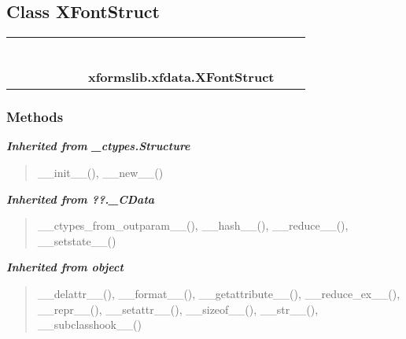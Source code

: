 \subsection{Class XFontStruct}

    \label{xformslib:xfdata:XFontStruct}
\begin{tabular}{cccccccccc}
\multicolumn{2}{r}{\settowidth{\BCL}{object}\multirow{2}{\BCL}{object}}
&&
&&
&&
  \\\cline{3-3}
  &&\multicolumn{1}{c|}{}
&&
&&
&&
  \\
\multicolumn{4}{r}{\settowidth{\BCL}{??.\_CData}\multirow{2}{\BCL}{??.\_CData}}
&&
&&
  \\\cline{5-5}
  &&&&\multicolumn{1}{c|}{}
&&
&&
  \\
\multicolumn{6}{r}{\settowidth{\BCL}{\_ctypes.Structure}\multirow{2}{\BCL}{\_ctypes.Structure}}
&&
  \\\cline{7-7}
  &&&&&&\multicolumn{1}{c|}{}
&&
  \\
&&&&&&\multicolumn{2}{l}{\textbf{xformslib.xfdata.XFontStruct}}
\end{tabular}



  \subsubsection{Methods}


\large{\textbf{\textit{Inherited from \_ctypes.Structure}}}

\begin{quote}
\_\_init\_\_(), \_\_new\_\_()
\end{quote}

\large{\textbf{\textit{Inherited from ??.\_CData}}}

\begin{quote}
\_\_ctypes\_from\_outparam\_\_(), \_\_hash\_\_(), \_\_reduce\_\_(), \_\_setstate\_\_()
\end{quote}

\large{\textbf{\textit{Inherited from object}}}

\begin{quote}
\_\_delattr\_\_(), \_\_format\_\_(), \_\_getattribute\_\_(), \_\_reduce\_ex\_\_(), \_\_repr\_\_(), \_\_setattr\_\_(), \_\_sizeof\_\_(), \_\_str\_\_(), \_\_subclasshook\_\_()
\end{quote}

